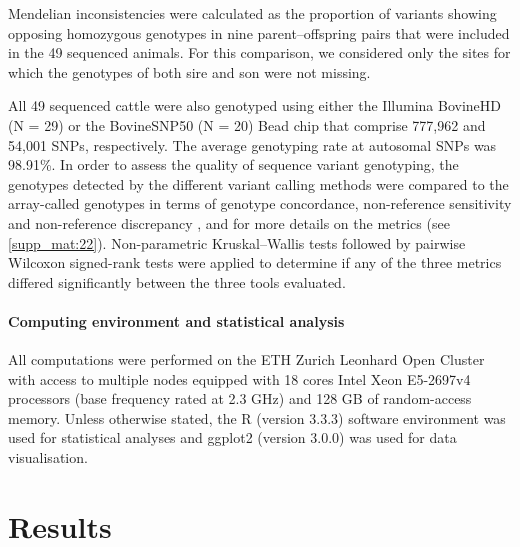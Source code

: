 \documentclass[../main.tex]{subfiles}
\begin{document}
Mendelian inconsistencies were calculated as the proportion of variants showing opposing homozygous genotypes in nine parent–offspring pairs that were included in the 49 sequenced animals. For this comparison, we considered only the sites for which the genotypes of both sire and son were not missing.

All    49    sequenced    cattle    were    also    genotyped    using  either  the  Illumina  BovineHD  (N  =  29)  or  the  BovineSNP50 (N = 20) Bead chip that comprise 777,962 and  54,001  SNPs,  respectively.  The  average  genotyping  rate  at  autosomal  SNPs  was  98.91\%.  In  order  to  assess  the  quality  of  sequence  variant  genotyping,  the  genotypes  detected  by  the  different  variant  calling  methods  were compared  to  the  array-called  genotypes  in  terms  of  genotype  concordance,  non-reference  sensitivity  and  non-reference discrepancy \citep{depristo2011framework,linderman2014analytical}, and for more details on  the  metrics  (see  \ref{supp_mat:22}).  Non-parametric  Kruskal–Wallis   tests   followed   by   pairwise   Wilcoxon   signed-rank tests were applied to determine if any of the three  metrics  differed  significantly  between  the  three  tools evaluated.


\paragraph{Computing environment and statistical analysis}

All computations were performed on the ETH Zurich Leonhard Open Cluster with access to multiple nodes equipped with 18 cores Intel Xeon E5-2697v4 processors (base frequency rated at 2.3 GHz) and 128 GB of random-access memory. Unless otherwise stated, the R (version 3.3.3) software environment \citep{team2013r} was used for statistical analyses and ggplot2 (version 3.0.0) \citep{wickham2016ggplot2} was used for data visualisation.

\section{Results}
\end{document}
